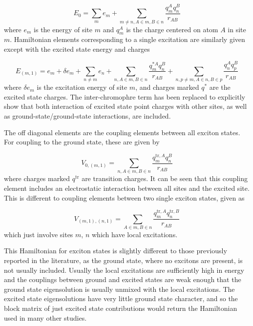 \begin{equation}
    E_0 = \sum_m e_m + \sum_{m \neq n, A \in m, B \in n} \frac{q^A_m q^B_n}{r_{AB}}
\end{equation}
%
where $e_m$ is the energy of site $m$ and $q^A_m$ is the charge centered on atom
$A$ in site $m$. Hamiltonian elements corresponding to a single excitation are similarly
given except with the excited state energy and charges

\begin{equation}
    E_{\left(m,1\right)} = e_m + \delta e_m + \sum_{n \neq m} e_n + \sum_{n, A \in m, B \in n} \frac{q^{\ast A}_m q^B_n}{r_{AB}} + \sum_{n,p \neq m, A \in n, B \in p} \frac{q^{A}_n q^B_p}{r_{AB}}
\end{equation}
%
where $\delta e_m$ is the excitation energy of site $m$, and charges marked $q^\ast$
are the excited state charges. The inter-chromophre term has been replaced to explicitly
show that both interaction of excited state point charges with other sites, as well
as ground-state/ground-state interactions, are included.

The off diagonal elements are the coupling elements between all exciton states.
For coupling to the ground state, these are given by

\begin{equation}
    V_{0, \left(m,1\right)} = \sum_{n, A \in m, B \in n} \frac{q^{\text{tr},A}_m q^B_n}{r_{AB}}
\end{equation}
%
where charges marked $q^{\text{tr}}$ are transition charges. It can be seen that 
this coupling element includes an electrostatic interaction between all sites and
the excited site. This is different to coupling elements between two single exciton
states, given as

\begin{equation}
    V_{\left(m, 1\right), \left(n,1\right)} = \sum_{A \in m, B \in n} \frac{q^{\text{tr},A}_m q^{\text{tr},B}_n}{r_{AB}}
    \label{eq:exciton_coupling}
\end{equation}
%
which just involve sites $m$, $n$ which have local excitations.

This Hamiltonian for exciton states is slightly different to those previously reported 
in the literature, as the ground state, where no excitons are present, is not usually
included. Usually the local excitations are sufficiently high in energy and the
couplings between ground and excited states are weak enough that the ground state 
eigensolution is usually unmixed with the local excitations. The excited state eigensolutions
have very little ground state character, and so the block matrix of just excited
state contributions would return the Hamiltonian used in many other studies.

